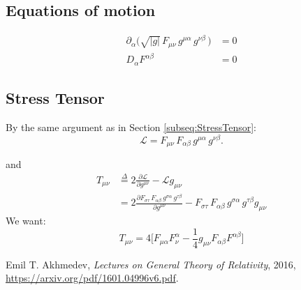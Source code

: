 \documentclass[]{article}
\newcommand{\Lagr}{\mathscr{L}}
\begin{document}
\subsection{Equations of motion}
\begin{align*}
\partial_\alpha \big(\sqrt{|g|} \, F_{\mu\nu} \, g^{\mu\alpha} \, g^{\nu\beta} \,\big) &= 0\\
 D_\alpha F^{\alpha\beta} &= 0
\end{align*}
\subsection{Stress Tensor}
By the same argument as in Section \ref{subseq:StressTensor}:
\begin{equation}
\Lagr= F_{\mu\nu}\, F_{\alpha\beta} \, g^{\mu\alpha} \, g^{\nu\beta}.
\label {eq:a}
\end{equation}

and
\begin{align}
T_{\mu\nu}&\overset{\Delta}{=}2 \frac{\partial \Lagr}{\partial g^{\mu\nu}} - \Lagr g_{\mu\nu}\\
&=2\frac{\partial F_{\sigma\tau}\, F_{\alpha\beta} \, g^{\sigma\alpha} \, g^{\tau\beta}}{\partial g^{\mu\nu}} - F_{\sigma\tau}\, F_{\alpha\beta} \, g^{\sigma\alpha} \, g^{\tau\beta} g_{\mu\nu}
\end{align}
We want:
$$T_{\mu\nu} = 4\big[F_{\mu\alpha} F^\alpha_\nu - \frac{1}{4}g_{\mu\nu} F_{\alpha\beta} F^{\alpha\beta}\big]$$

\begin{thebibliography}{9}

Emil T. Akhmedev,
\emph{Lectures on General Theory of Relativity},
2016,
\url{https://arxiv.org/pdf/1601.04996v6.pdf}.

\end{thebibliography}
\end{document}
